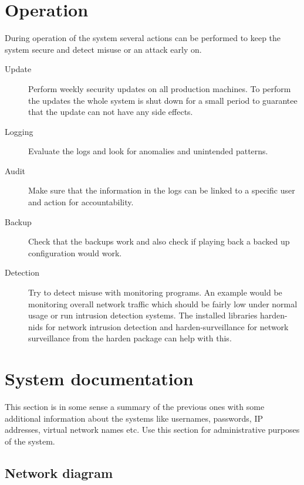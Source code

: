 \documentclass[a4paper, toc=index, 12pt, DIV14, twoside, BCOR2cm, headsepline, numbers=noenddot, bibliography=totoc]{scrbook}
\begin{document}
\section{Operation}
During operation of the system several actions can be performed to keep the system secure and detect misuse or an attack early on.\newline
\begin{description}
\item[Update ] Perform weekly security updates on all production machines. To perform the updates the whole system is shut down for a small period to guarantee that the update can not have any side effects.
\item[Logging ] Evaluate the logs and look for anomalies and unintended patterns.
\item[Audit ] Make sure that the information in the logs can be linked to a specific user and action for accountability.
\item[Backup ] Check that the backups work and also check if playing back a backed up configuration would work.
\item[Detection ] Try to detect misuse with monitoring programs. An example would be monitoring overall network traffic which should be fairly low under normal usage or run intrusion detection systems. The installed libraries harden-nids for network intrusion detection and harden-surveillance for network surveillance from the harden package can help with this.
\end{description}

\section{System documentation}
This section is in some sense a summary of the previous ones with some additional information about the systems like usernames, passwords, IP addresses, virtual network names etc. Use this section for administrative purposes of the system.\newline

\subsection{Network diagram}
\end{document}
